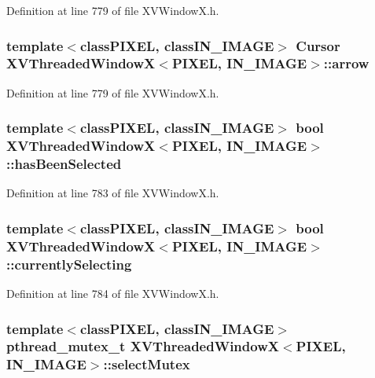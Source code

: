 Definition at line 779 of file XVWindow\-X.h.\label{XVThreadedWindowX_n2}
\hypertarget{class_XVThreadedWindowX_n2}{
\subsubsection[arrow]{\setlength{\rightskip}{0pt plus 5cm}template$<$classPIXEL, classIN\_\-IMAGE$>$ Cursor XVThreaded\-Window\-X$<$PIXEL, IN\_\-IMAGE$>$::arrow}}




Definition at line 779 of file XVWindow\-X.h.\label{XVThreadedWindowX_n3}
\hypertarget{class_XVThreadedWindowX_n3}{
\subsubsection[hasBeenSelected]{\setlength{\rightskip}{0pt plus 5cm}template$<$classPIXEL, classIN\_\-IMAGE$>$ bool XVThreaded\-Window\-X$<$PIXEL, IN\_\-IMAGE$>$::has\-Been\-Selected}}




Definition at line 783 of file XVWindow\-X.h.\label{XVThreadedWindowX_n4}
\hypertarget{class_XVThreadedWindowX_n4}{
\subsubsection[currentlySelecting]{\setlength{\rightskip}{0pt plus 5cm}template$<$classPIXEL, classIN\_\-IMAGE$>$ bool XVThreaded\-Window\-X$<$PIXEL, IN\_\-IMAGE$>$::currently\-Selecting}}




Definition at line 784 of file XVWindow\-X.h.\label{XVThreadedWindowX_n5}
\hypertarget{class_XVThreadedWindowX_n5}{
\subsubsection[selectMutex]{\setlength{\rightskip}{0pt plus 5cm}template$<$classPIXEL, classIN\_\-IMAGE$>$ pthread\_\-mutex\_\-t XVThreaded\-Window\-X$<$PIXEL, IN\_\-IMAGE$>$::select\-Mutex}}




